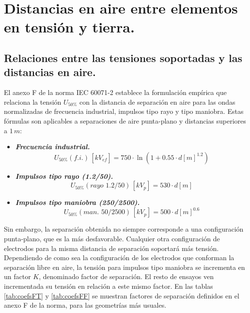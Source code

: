     \section{Distancias en aire entre elementos en tensión y tierra.}
        \subsection{Relaciones entre las tensiones soportadas y las distancias en aire.}
            El anexo F de la norma IEC 60071-2 establece la formulación empírica que relaciona la tensión $U_{50\!\text{\%}}$ con la distancia de separación en aire para las ondas normalizadas de frecuencia industrial, impulsos tipo rayo y tipo maniobra. Estas fórmulas son aplicables a separaciones de aire punta-plano y distancias superiores a $1\,\textit{m}$:
            \begin{itemize}
                \item \textit{\textbf{Frecuencia industrial.}}
                \begin{equation}
                    U_{50\!\text{\%}}(\textit{f.i.})\,[\textit{kV}_\textit{ef}]= 750\cdot \ln(1+0.55\cdot d[\textit{m}]^{1.2})
                \end{equation}

                \item \textit{\textbf{Impulsos tipo rayo (1.2/50).}}
                \begin{equation}
                    U_{50\!\text{\%}}(\textit{rayo }1.2/50)\,[\textit{kV}_\textit{p}]= 530\cdot d[\textit{m}]
                \end{equation}

                \item \textit{\textbf{Impulsos tipo maniobra (250/2500).}}
                \begin{equation}
                    U_{50\!\text{\%}}(\textit{man. }50/2500)\,[\textit{kV}_\textit{p}]= 500\cdot d[\textit{m}]^{0.6}
                \end{equation}
            \end{itemize}

            Sin embargo, la separación obtenida no siempre corresponde a una configuración punta-plano, que es la más desfavorable. Cualquier otra configuración de electrodos para la misma distancia de separación soportará más tensión. Dependiendo de como sea la configuración de los electrodos que conforman la separación libre en aire, la tensión para impulsos tipo maniobra se incrementa en un factor $K$, denominado factor de separación. El resto de ensayos ven incrementada su tensión en relación a este mismo factor. En las tablas \ref{tab:coefsFT} y \ref{tab:coefsFF} se muestran factores de separación definidos en el anexo F de la norma, para las geometrías más usuales.


